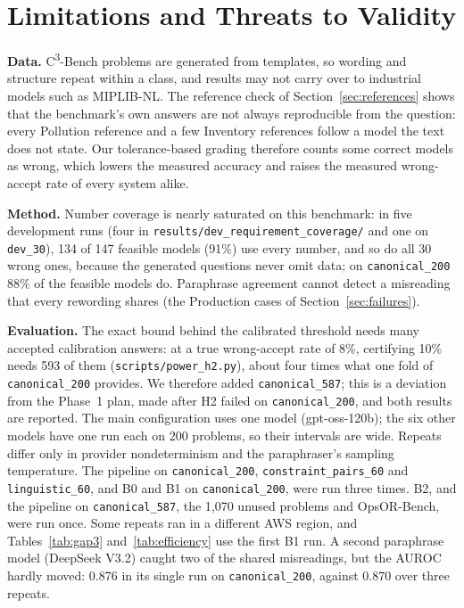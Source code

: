 \documentclass[conference]{IEEEtran}
\newcommand{\cthree}{C\textsuperscript{3}-Bench}
\begin{document}
\section{Limitations and Threats to Validity}
\textbf{Data.} \cthree{} problems are generated from templates, so wording and structure repeat within a class, and
results may not carry over to industrial models such as MIPLIB-NL. The reference check of
Section~\ref{sec:references} shows that the benchmark's own answers are not always reproducible from the question:
every Pollution reference and a few Inventory references follow a model the text does not state. Our tolerance-based
grading therefore counts some correct models as wrong, which lowers the measured accuracy and raises the measured
wrong-accept rate of every system alike.

\textbf{Method.} Number coverage is nearly saturated on this benchmark: in five development runs (four in
\texttt{results/dev\_requirement\_coverage/} and one on \texttt{dev\_30}), 134 of 147 feasible models (91\%) use every
number, and so do all 30 wrong ones, because the generated questions never omit data; on \texttt{canonical\_200} 88\%
of the feasible models do. Paraphrase agreement
cannot detect a misreading that every rewording shares (the Production cases of Section~\ref{sec:failures}).

\textbf{Evaluation.} The exact bound behind the calibrated threshold needs many accepted calibration answers: at a
true wrong-accept rate of 8\%, certifying 10\% needs 593 of them (\texttt{scripts/power\_h2.py}), about four times
what one fold of \texttt{canonical\_200} provides. We therefore added \texttt{canonical\_587}; this is a deviation
from the Phase~1 plan, made after H2 failed on \texttt{canonical\_200}, and both results are reported. The main
configuration uses one model (gpt-oss-120b); the six other models have one run each on 200 problems, so their
intervals are wide. Repeats differ only in provider nondeterminism and the paraphraser's sampling temperature.
The pipeline on \texttt{canonical\_200}, \texttt{constraint\_pairs\_60} and \texttt{linguistic\_60}, and B0 and B1
on \texttt{canonical\_200}, were run three times. B2, and the pipeline on \texttt{canonical\_587}, the 1,070 unused
problems and OpsOR-Bench, were run once. Some repeats ran in a different AWS region, and Tables~\ref{tab:gap3} and~\ref{tab:efficiency} use the first B1
run. A second paraphrase model (DeepSeek V3.2) caught two of the shared misreadings, but the AUROC hardly moved: 0.876
in its single run on \texttt{canonical\_200}, against 0.870 over three repeats.
\end{document}
